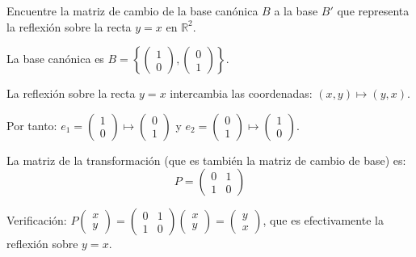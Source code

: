 \begin{prob} Encuentre la matriz de cambio de la base canónica $B$ a la base $B'$ que representa la reflexión sobre la recta $y=x$ en $\mathbb{R}^2$.

\begin{myproof}
La base canónica es $B = \left\{\begin{pmatrix}1\\0\end{pmatrix}, \begin{pmatrix}0\\1\end{pmatrix}\right\}$.

La reflexión sobre la recta $y=x$ intercambia las coordenadas: $(x,y) \mapsto (y,x)$.

Por tanto: $e_1 = \begin{pmatrix}1\\0\end{pmatrix} \mapsto \begin{pmatrix}0\\1\end{pmatrix}$ y $e_2 = \begin{pmatrix}0\\1\end{pmatrix} \mapsto \begin{pmatrix}1\\0\end{pmatrix}$.

La matriz de la transformación (que es también la matriz de cambio de base) es:
$$P = \begin{pmatrix}0&1\\1&0\end{pmatrix}$$

Verificación: $P\begin{pmatrix}x\\y\end{pmatrix} = \begin{pmatrix}0&1\\1&0\end{pmatrix}\begin{pmatrix}x\\y\end{pmatrix} = \begin{pmatrix}y\\x\end{pmatrix}$, que es efectivamente la reflexión sobre $y=x$.
\end{myproof}
\end{prob}

